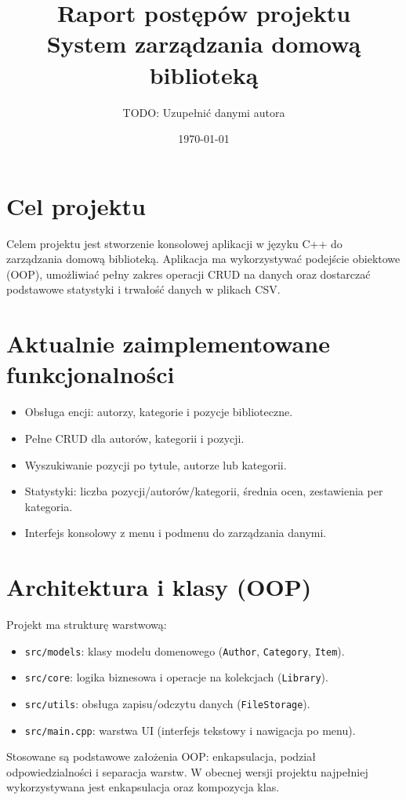 \documentclass[12pt,a4paper]{article}
\title{Raport postępów projektu\\System zarządzania domową biblioteką}
\author{TODO: Uzupełnić danymi autora}
\date{\today}
\begin{document}
\maketitle

\section{Cel projektu}
Celem projektu jest stworzenie konsolowej aplikacji w języku C++ do zarządzania domową biblioteką.
Aplikacja ma wykorzystywać podejście obiektowe (OOP), umożliwiać pełny zakres operacji CRUD
na danych oraz dostarczać podstawowe statystyki i trwałość danych w plikach CSV.

\section{Aktualnie zaimplementowane funkcjonalności}
\begin{itemize}[leftmargin=*]
    \item Obsługa encji: autorzy, kategorie i pozycje biblioteczne.
    \item Pełne CRUD dla autorów, kategorii i pozycji.
    \item Wyszukiwanie pozycji po tytule, autorze lub kategorii.
    \item Statystyki: liczba pozycji/autorów/kategorii, średnia ocen, zestawienia per kategoria.
    \item Interfejs konsolowy z menu i podmenu do zarządzania danymi.
\end{itemize}

\section{Architektura i klasy (OOP)}
Projekt ma strukturę warstwową:
\begin{itemize}[leftmargin=*]
    \item \texttt{src/models}: klasy modelu domenowego (\texttt{Author}, \texttt{Category}, \texttt{Item}).
    \item \texttt{src/core}: logika biznesowa i operacje na kolekcjach (\texttt{Library}).
    \item \texttt{src/utils}: obsługa zapisu/odczytu danych (\texttt{FileStorage}).
    \item \texttt{src/main.cpp}: warstwa UI (interfejs tekstowy i nawigacja po menu).
\end{itemize}
Stosowane są podstawowe założenia OOP: enkapsulacja, podział odpowiedzialności i separacja warstw.
W obecnej wersji projektu najpełniej wykorzystywana jest enkapsulacja oraz kompozycja klas.
\end{document}
